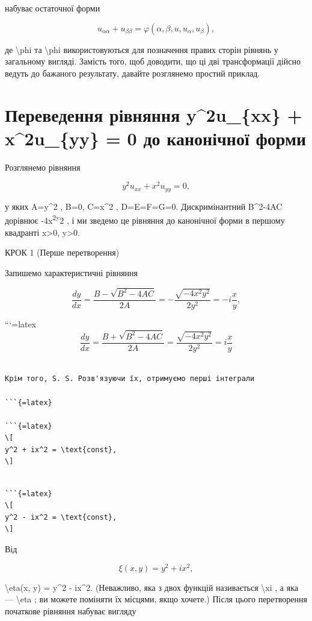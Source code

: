 \documentclass[
]{article}
\begin{document}
набуває остаточної форми

\[
u_{\alpha\alpha} + u_{\beta\beta} = \varphi(\alpha, \beta, u, u_{\alpha}, u_{\beta}),
\]

де \textbackslash phi та \textbackslash phi використовуються для
позначення правих сторін рівнянь у загальному вигляді. Замість того, щоб
доводити, що ці дві трансформації дійсно ведуть до бажаного результату,
давайте розглянемо простий приклад.

\section{Переведення рівняння y\^{}2u\_\{xx\} + x\^{}2u\_\{yy\} = 0 до
канонічної
форми}\label{ux43fux435ux440ux435ux432ux435ux434ux435ux43dux43dux44f-ux440ux456ux432ux43dux44fux43dux43dux44f-y2u_xx-x2u_yy-0-ux434ux43e-ux43aux430ux43dux43eux43dux456ux447ux43dux43eux457-ux444ux43eux440ux43cux438}

Розглянемо рівняння

\[
y^2 u_{xx} + x^2 u_{yy} = 0,
\]

у яких A=y\^{}2 , B=0, C=x\^{}2 , D=E=F=G=0. Дискримінантний B\^{}2-4AC
дорівнює -4x\textsuperscript{2y}2 , і ми зведемо це рівняння до
канонічної форми в першому квадранті x\textgreater0, y\textgreater0.

КРОК 1 (Перше перетворення)

Запишемо характеристичні рівняння

\[
\frac{dy}{dx} = \frac{B - \sqrt{B^2 - 4AC}}{2A} = -\frac{\sqrt{-4x^2y^2}}{2y^2} = -i\frac{x}{y},
\]

```{=latex}
\[
\frac{dy}{dx} = \frac{B + \sqrt{B^2 - 4AC}}{2A} = \frac{\sqrt{-4x^2y^2}}{2y^2} = i\frac{x}{y}
\]

\begin{verbatim}

Крім того, S. S. Розв'язуючи їх, отримуємо перші інтеграли

```{=latex}

```{=latex}
\[
y^2 + ix^2 = \text{const},
\]
\end{verbatim}

\begin{verbatim}

```{=latex}
\[
y^2 - ix^2 = \text{const},
\]
\end{verbatim}

Від

\[
\xi(x, y) = y^2 + ix^2,
\]

\textbackslash eta(x, y) = y\^{}2 - ix\^{}2. (Неважливо, яка з двох
функцій називається \textbackslash xi , а яка --- \textbackslash eta ;
ви можете поміняти їх місцями, якщо хочете.) Після цього перетворення
початкове рівняння набуває вигляду
\end{document}
